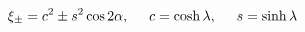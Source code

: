 \begin{equation}
\xi_\pm = c^2 \pm s^2 \cos 2\alpha,
\hspace{0.5cm} c= \cosh \lambda, \hspace{0.5cm}
s = \sinh \lambda
\end{equation}

